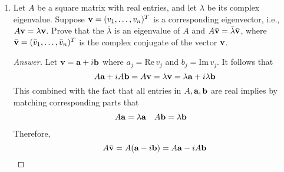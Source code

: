 \documentclass[../psets.tex]{subfiles}
\begin{document}
\begin{enumerate}[label={\textbf{2.\arabic*.}}]
\begin{enumerate}
\begin{proof}[Answer]
\begin{align*}
\begin{pmatrix}
                    2\\
                    1\\
                \end{pmatrix}&&
                \begin{pmatrix}
                    -2\\
                    1\\
                \end{pmatrix}
            \end{align*}
        \end{proof}
        \item If $A$ is diagonalizable, then so is $A^T$.
        \begin{proof}[Answer]
            True.\par
            Suppose $A=SDS^{-1}$. Then
            \begin{align*}
                A^T &= (SDS^{-1})^T\\
                &= (S^{-1})^TD^TS^T\\
                &= (S^{-1})^TD((S^{-1})^T)^{-1}
            \end{align*}
            as desired.
        \end{proof}
    \end{enumerate}
    \item Let $A$ be a square matrix with real entries, and let $\lambda$ be its complex eigenvalue. Suppose $\mathbf{v}=(v_1,\dots,v_n)^T$ is a corresponding eigenvector, i.e., $A\mathbf{v}=\lambda\mathbf{v}$. Prove that the $\bar{\lambda}$ is an eigenvalue of $A$ and $A\bar{\mathbf{v}}=\bar{\lambda}\bar{\mathbf{v}}$, where $\bar{\mathbf{v}}=(\bar{v}_1,\dots,\bar{v}_n)^T$ is the complex conjugate of the vector $\mathbf{v}$.
    \begin{proof}[Answer]
        Let $\mathbf{v}=\mathbf{a}+i\mathbf{b}$ where $a_j=\text{Re}\,v_j$ and $b_j=\text{Im}\,v_j$. It follows that
        \begin{equation*}
            A\mathbf{a}+iA\mathbf{b} = A\mathbf{v}
            = \lambda\mathbf{v}
            = \lambda\mathbf{a}+i\lambda\mathbf{b}
        \end{equation*}
        This combined with the fact that all entries in $A,\mathbf{a},\mathbf{b}$ are real implies by matching corresponding parts that
        \begin{align*}
            A\mathbf{a} &= \lambda\mathbf{a}&
            A\mathbf{b} &= \lambda\mathbf{b}
        \end{align*}
        Therefore,
        \begin{equation*}
            A\bar{\vm} = A(\ab-i\bb)
            = A\ab-iA\bb

\end{equation*}
\end{proof}
\end{enumerate}
\end{document}
